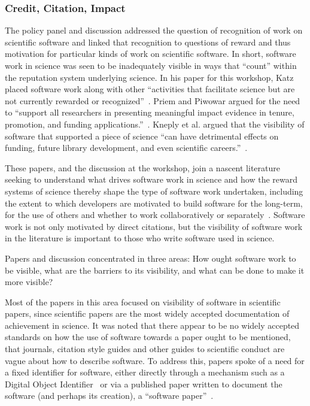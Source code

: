 \documentclass[11pt, oneside]{amsart}
\begin{document}
\subsubsection*{Credit, Citation, Impact}

The policy panel and discussion addressed the question of recognition of work on scientific software and linked that recognition to questions of reward and thus motivation for particular kinds of work on scientific software. In short, software work in science was seen to be inadequately visible in ways that ``count'' within the reputation system underlying science. In his paper for this workshop, Katz placed software work along with other ``activities that facilitate science but are not currently rewarded or recognized''~\cite{Katz_WSSSPE}. Priem and Piwowar argued for the need to ``support all researchers in presenting meaningful impact evidence in tenure, promotion, and funding applications.''~\cite{Priem_WSSSPE}.  Kneply et al. argued that the visibility of software that supported a piece of science ``can have detrimental effects on funding, future library development, and even scientific careers.''~\cite{Knepley_WSSSPE}.

These papers, and the discussion at the workshop, join a nascent literature seeking to understand what drives software work in science and how the reward systems of science thereby shape the type of software work undertaken, including the extent to which developers are motivated to build software for the long-term, for the use of others and whether to work collaboratively or separately~\cite{howison_incentives_2013, howison_scientific_2011, bietz_synergizing_2010}. Software work is not only motivated by direct citations, but the visibility of software work in the literature is important to those who write software used in science.

Papers and discussion concentrated in three areas: How ought software work to be visible, what are the barriers to its visibility, and what can be done to make it more visible?

Most of the papers in this area focused on visibility of software in scientific papers, since scientific papers are the most widely accepted documentation of achievement in science. It was noted that there appear to be no widely accepted standards on how the use of software towards a paper ought to be mentioned, that journals, citation style guides and other guides to scientific conduct are vague about how to describe software. To address this, papers spoke of a need for a fixed identifier for software, either directly through a mechanism such as a Digital Object Identifier~\cite{Katz_WSSSPE,Knepley_WSSSPE} or via a published paper written to document the software (and perhaps its creation), a ``software paper''~\cite{Chue_Hong_WSSSPE}.
\end{document}
